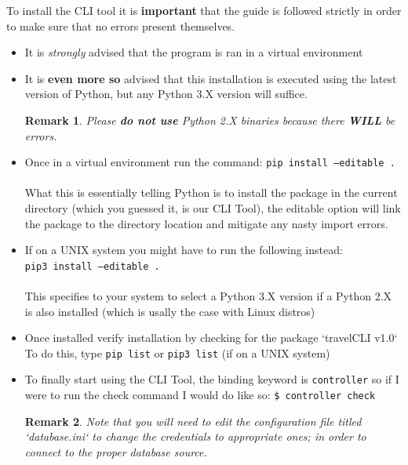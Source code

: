 \documentclass[12pt, lettersize]{article}
\theoremstyle{Remark}
\newtheorem*{remark}{Remark}
\begin{document}
		 
	 To install the CLI tool it is \textbf{important} that the guide is followed strictly in order to make sure that no errors present themselves.
	 
	 \begin{itemize}
	 	
	 	\item It is \textsl{strongly} advised that the program is ran in a virtual environment
	 	
	 	\item It is \textbf{even more so} advised that this installation is executed using the latest version of Python, but any Python 3.X version will suffice.
	 	
	 	\begin{remark}
	 		Please \textbf{do not use} Python 2.X binaries because there \textbf{WILL} be errors.
	 	\end{remark}
	 	
	 	\item  Once in a virtual environment run the command: \texttt{pip install --editable .} \\\\
	 	What this is essentially telling Python is to install the package in the current directory (which you guessed it, is our CLI Tool), the editable option will link the package to the directory location and mitigate any nasty import errors.
	 	
	 	\item If on a UNIX system you might have to run the following instead: \\
	 	\texttt{pip3 install --editable .} \\ \\
	 	This specifies to your system to select a Python 3.X version if a Python 2.X is also installed (which is usally the case with Linux distros)
	 	
	 	\item Once installed verify installation by checking for the package `travelCLI   v1.0`
	 	To do this, type \texttt{pip list} or \texttt{pip3 list} (if on a UNIX system)
	 	
	 	\item To finally start using the CLI Tool, the binding keyword is \texttt{controller} so if I were to run the check command I would do like so:
	 	\texttt{\$ controller check}
	 	
	 	\begin{remark}
	 		Note that you will need to edit the configuration file titled `database.ini` to change the credentials to appropriate ones; in order to connect to the proper database source.
	 	\end{remark}
	 	
	 \end{itemize}
	 
 
	
\end{document}
